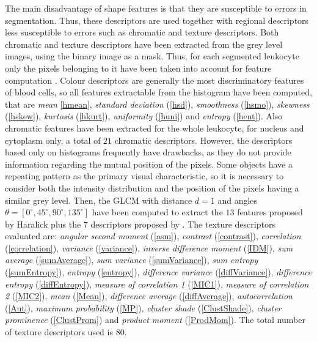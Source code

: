 \documentclass[final,a4paper,12pt,english]{UnicaPhdThesis3}
\begin{document}
The  main  disadvantage of shape  features  is that  they  are susceptible to errors in segmentation. Thus, these descriptors  are used together  with  regional descriptors less susceptible to errors such as chromatic and texture descriptors.
Both chromatic and texture descriptors have been extracted from the grey level images, using the binary image as a mask. Thus, for each segmented leukocyte only the pixels belonging to it have been taken into account for feature computation \cite{Put14b}. Colour descriptors are generally the most discriminatory features of blood cells, so all features extractable from the histogram have been computed, that are \textit{mean} \ref{hmean},  \textit{standard deviation} (\ref{hsd}), \textit{smoothness} (\ref{hsmo}), \textit{skewness} (\ref{hskew}), \textit{kurtosis} (\ref{hkurt}), \textit{uniformity} (\ref{huni}) and \textit{entropy} (\ref{hent}). Also chromatic features have been extracted for the whole leukocyte, for nucleus and cytoplasm only, a total of $21$ chromatic descriptors.
However, the descriptors based only on histograms frequently have drawbacks, as they do not provide information regarding the mutual  position of the pixels. Some objects have a repeating  pattern as the primary  visual characteristic, so it is necessary to consider both the intensity distribution and the position of the pixels having a similar grey level. Then, the GLCM with distance $d = 1$ and angles $\theta = [0 ^\circ, 45 ^\circ, 90 ^\circ, 135 ^\circ]$ have been computed to extract the $13$ features proposed by Haralick \cite{Haralick} plus the $7$ descriptors proposed by \cite{Soh, Clausi}. The texture descriptors evaluated are: \textit{angular second moment} (\ref{asm}), \textit{contrast} (\ref{contrast}), \textit{correlation} (\ref{correlation}), \textit{variance} (\ref{variance}), \textit{inverse difference moment} (\ref{IDM}), \textit{sum average} (\ref{sumAverage}), \textit{sum variance} (\ref{sumVariance}), \textit{sum entropy} (\ref{sumEntropy}), \textit{entropy} (\ref{entropy}), \textit{difference variance} (\ref{diffVariance}), \textit{difference entropy} (\ref{diffEntropy}), \textit{measure of correlation 1} (\ref{MIC1}), \textit{measure of correlation 2} (\ref{MIC2}), \textit{mean} (\ref {Mean}), \textit{difference average} (\ref{diffAverage}), \textit{autocorrelation} (\ref{Aut}), \textit{maximum probability} (\ref{MP}), \textit{cluster shade} (\ref{ClustShade}),  \textit{cluster prominence} (\ref {ClustProm}) and \textit{product moment} (\ref {ProdMom}). The total number of texture descriptors used is $80$.
\end{document}
